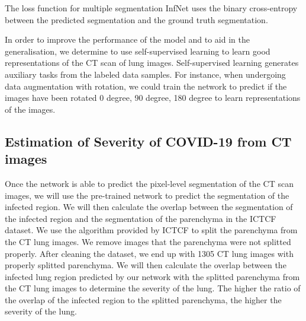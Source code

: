 The loss function for multiple segmentation InfNet uses the binary cross-entropy between the predicted segmentation and the ground truth segmentation.

In order to improve the performance of the model and to aid in the generalisation, we  determine to use self-supervised learning to learn good representations of the CT scan of lung images. Self-supervised learning generates auxiliary tasks from the labeled data samples. For instance, when undergoing data augmentation with rotation, we could train the network to predict if the images have been rotated 0 degree, 90 degree, 180 degree to learn representations of the images. 


\subsection{Estimation of Severity of COVID-19 from CT images}
Once the network is able to predict the pixel-level segmentation of the CT scan images, we will use the pre-trained network to predict the segmentation of the infected region. We will then calculate the overlap between the segmentation of the infected region and the segmentation of the parenchyma in the ICTCF dataset. We use the algorithm provided by ICTCF to split the parenchyma from the CT lung images. We remove images that the parenchyma were not splitted properly. After cleaning the dataset, we end up with 1305 CT lung images with properly splitted parenchyma. We will then calculate the overlap between the infected lung region predicted by our network with the splitted parenchyma from the CT lung images to determine the severity of the lung. The higher the ratio of the overlap of the infected region to the splitted parenchyma, the higher the severity of the lung.


